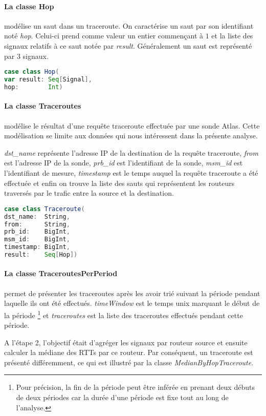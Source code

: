 \paragraph{La classe Hop} modélise un saut dans un traceroute. On caractérise un saut par son identifiant noté \textit{hop}. Celui-ci   prend comme valeur un entier commençant à $1$ et la liste des signaux relatifs à ce saut notée par \textit{result}. Généralement un saut est représenté par $3$ signaux.
\begin{lstlisting}[language=scala]
case class Hop(
var result: Seq[Signal],
hop:        Int)
\end{lstlisting}
\paragraph{La classe Traceroutes} modélise le résultat d'une requête traceroute effectuée par une sonde Atlas. Cette modélisation se limite aux données qui nous intéressent dans la présente analyse. 

\textit{dst\_name} représente l'adresse IP de la destination de la requête traceroute, \textit{from} est l'adresse IP de la sonde, \textit{prb\_id} est l'identifiant de la sonde, \textit{msm\_id} est l'identifiant de mesure, \textit{timestamp} est le temps auquel la requête traceroute a été effectuée et enfin on trouve la liste des sauts qui représentent les routeurs traversés par le trafic entre la source et la destination. 

\begin{lstlisting}[language=scala]
case class Traceroute(
dst_name:  String,
from:      String,
prb_id:    BigInt,
msm_id:    BigInt,
timestamp: BigInt,
result:    Seq[Hop])
\end{lstlisting}
\paragraph{La classe TraceroutesPerPeriod} permet de présenter les traceroutes après les avoir trié   suivant la période pendant laquelle ils ont été effectués.   \textit{timeWindow} est le temps unix marquant le début de la période \footnote{Pour précision, la fin de la période peut être inférée en prenant deux débuts de deux périodes car la durée d'une période est fixe tout au long de l'analyse.} et  \textit{traceroutes} est la liste des traceroutes effectués pendant cette période. 


A l'étape 2, l'objectif était d'agréger  les signaux par routeur source et ensuite calculer la médiane des RTTs par ce routeur. Par conséquent, un traceroute est présenté différemment, ce qui est  illustré par la classe \textit{MedianByHopTraceroute}.

